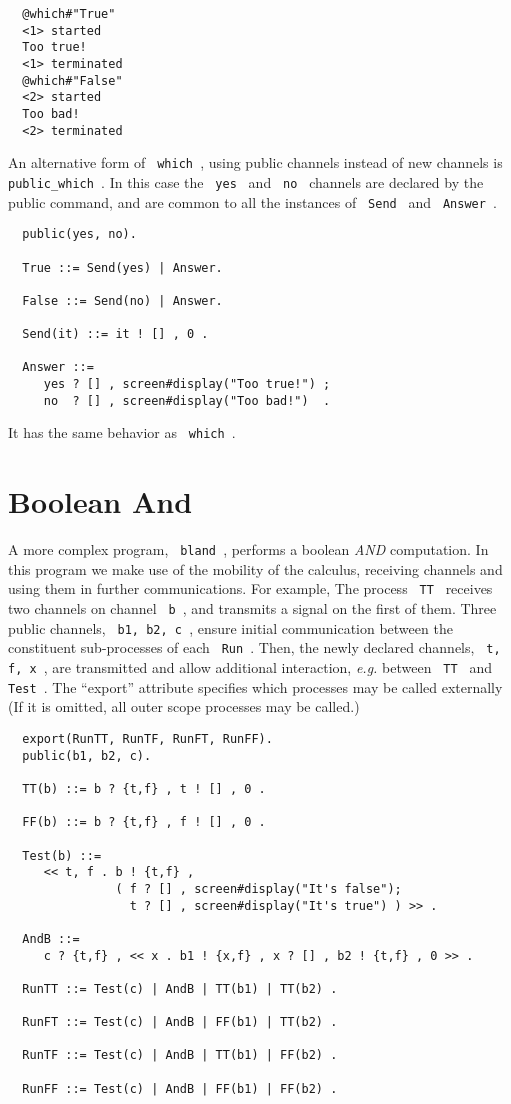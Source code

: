 \begin{verbatim}
  @which#"True"
  <1> started
  Too true!
  <1> terminated
  @which#"False"
  <2> started
  Too bad!
  <2> terminated
\end{verbatim}

\noindent
An alternative form of \verb+ which +, using public channels instead
of new channels is \verb+ public_which +. In this case the
\verb+ yes + and \verb+ no + channels are declared by the public
command, and are common to all the instances of \verb+ Send +
and \verb+ Answer +.

\begin{verbatim}
  public(yes, no).

  True ::= Send(yes) | Answer.

  False ::= Send(no) | Answer.

  Send(it) ::= it ! [] , 0 .

  Answer ::=
     yes ? [] , screen#display("Too true!") ;
     no  ? [] , screen#display("Too bad!")  .
\end{verbatim}

\noindent
It has the same behavior as \verb+ which +.

\section{Boolean And}
\label{bland}

A more complex program, \verb+ bland +, performs a boolean {\em AND}
computation.  In this program we make use of the mobility of the
calculus, receiving channels and using them in further
communications. For example, The process \verb+ TT + receives two
channels on channel \verb+ b +, and transmits a signal on the first
of them. Three public channels, \verb+ b1, b2, c +, ensure initial
communication between the constituent sub-processes of each 
\verb+ Run +. Then, the  newly declared channels, \verb+ t, f, x +,
are transmitted and allow additional interaction, {\em e.g.} between
\verb+ TT + and \verb+ Test +.  The ``export'' attribute specifies
which processes may be called externally (If it is omitted, all
outer scope processes may be called.)

\begin{verbatim}
  export(RunTT, RunTF, RunFT, RunFF).
  public(b1, b2, c).

  TT(b) ::= b ? {t,f} , t ! [] , 0 .

  FF(b) ::= b ? {t,f} , f ! [] , 0 .

  Test(b) ::=
     << t, f . b ! {t,f} , 
               ( f ? [] , screen#display("It's false");
                 t ? [] , screen#display("It's true") ) >> .

  AndB ::=
     c ? {t,f} , << x . b1 ! {x,f} , x ? [] , b2 ! {t,f} , 0 >> .

  RunTT ::= Test(c) | AndB | TT(b1) | TT(b2) .

  RunFT ::= Test(c) | AndB | FF(b1) | TT(b2) .

  RunTF ::= Test(c) | AndB | TT(b1) | FF(b2) .

  RunFF ::= Test(c) | AndB | FF(b1) | FF(b2) .
\end{verbatim}

